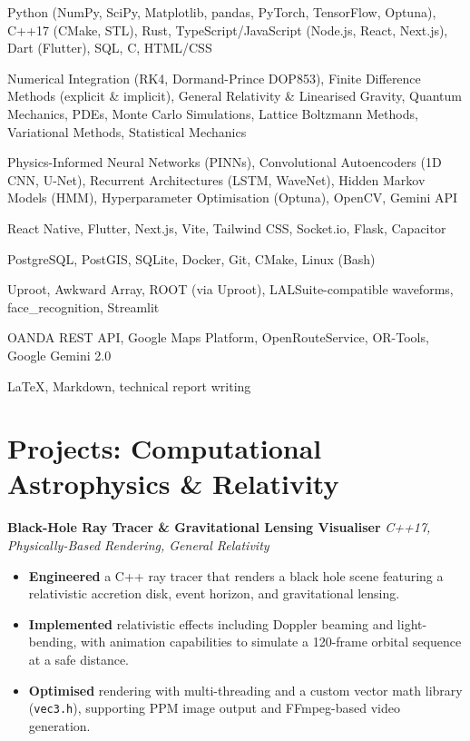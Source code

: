 \documentclass[10pt, a4paper]{article}
\newenvironment{project}[2]{%
  \textbf{\color{accent}#1} \hfill
  \small\textit{\color{light}#2}%
  \begin{itemize}%
}{%
  \end{itemize}%
  \vspace{2pt}%
}
\begin{document}
\begin{description}[leftmargin=4.4cm, style=sameline, labelsep=0.4em,
                    font=\bfseries\color{accent}, itemsep=3pt, parsep=0pt, topsep=2pt]
  \item[Programming Languages]
    Python (NumPy, SciPy, Matplotlib, pandas, PyTorch, TensorFlow, Optuna),
    C++17 (CMake, STL), Rust, TypeScript/JavaScript (Node.js, React, Next.js),
    Dart (Flutter), SQL, C, HTML/CSS
  \item[Physics \& Maths]
    Numerical Integration (RK4, Dormand-Prince DOP853), Finite Difference Methods
    (explicit \& implicit), General Relativity \& Linearised Gravity, Quantum Mechanics,
    PDEs, Monte Carlo Simulations, Lattice Boltzmann Methods,
    Variational Methods, Statistical Mechanics
  \item[Machine Learning \& AI]
    Physics-Informed Neural Networks (PINNs), Convolutional Autoencoders (1D CNN, U-Net),
    Recurrent Architectures (LSTM, WaveNet), Hidden Markov Models (HMM),
    Hyperparameter Optimisation (Optuna), OpenCV, Gemini API
  \item[Web \& Mobile]
    React Native, Flutter, Next.js, Vite, Tailwind CSS, Socket.io, Flask, Capacitor
  \item[Databases \& DevOps]
    PostgreSQL, PostGIS, SQLite, Docker, Git, CMake, Linux (Bash)
  \item[Scientific Libraries]
    Uproot, Awkward Array, ROOT (via Uproot), LALSuite-compatible waveforms,
    face\_recognition, Streamlit
  \item[Domain APIs]
    OANDA REST API, Google Maps Platform, OpenRouteService, OR-Tools, Google Gemini 2.0
  \item[Authoring]
    \LaTeX, Markdown, technical report writing
\end{description}

\section{Projects: Computational Astrophysics \& Relativity}

\begin{project}{Black-Hole Ray Tracer \& Gravitational Lensing Visualiser}{C++17, Physically-Based Rendering, General Relativity}
  \item \textbf{Engineered} a C++ ray tracer that renders a black hole scene featuring a relativistic accretion disk, event horizon, and gravitational lensing.
  \item \textbf{Implemented} relativistic effects including Doppler beaming and light-bending, with animation capabilities to simulate a 120-frame orbital sequence at a safe distance.
  \item \textbf{Optimised} rendering with multi-threading and a custom vector math library (\texttt{vec3.h}), supporting PPM image output and FFmpeg-based video generation.
\end{project}
\end{document}
